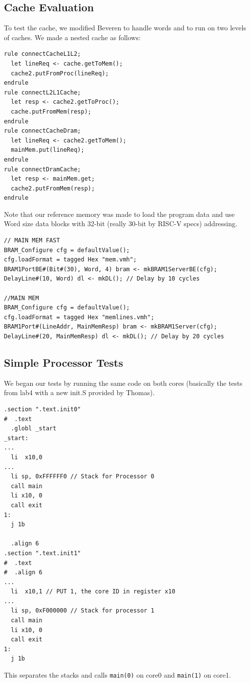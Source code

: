 \documentclass{article}
\begin{document}
\subsection{Cache Evaluation}
To test the cache, we modified Beveren to handle words and to run on two levels of caches. We made a nested cache as follows:
\begin{lstlisting}
rule connectCacheL1L2;
  let lineReq <- cache.getToMem();
  cache2.putFromProc(lineReq);
endrule
rule connectL2L1Cache;
  let resp <- cache2.getToProc();
  cache.putFromMem(resp);
endrule
rule connectCacheDram;
  let lineReq <- cache2.getToMem();
  mainMem.put(lineReq);
endrule
rule connectDramCache;
  let resp <- mainMem.get;
  cache2.putFromMem(resp);
endrule
\end{lstlisting}
Note that our reference memory was made to load the program data and use Word size data blocks with 32-bit (really 30-bit by RISC-V specs) addressing.
\begin{lstlisting}
// MAIN MEM FAST
BRAM_Configure cfg = defaultValue();
cfg.loadFormat = tagged Hex "mem.vmh";
BRAM1PortBE#(Bit#(30), Word, 4) bram <- mkBRAM1ServerBE(cfg);
DelayLine#(10, Word) dl <- mkDL(); // Delay by 10 cycles

//MAIN MEM
BRAM_Configure cfg = defaultValue();
cfg.loadFormat = tagged Hex "memlines.vmh";
BRAM1Port#(LineAddr, MainMemResp) bram <- mkBRAM1Server(cfg);
DelayLine#(20, MainMemResp) dl <- mkDL(); // Delay by 20 cycles
\end{lstlisting}

\subsection{Simple Processor Tests}

We began our tests by running the same code on both cores (basically the tests from lab4 with a new init.S provided by Thomas).

\begin{lstlisting}[language=RSVAssembler]
.section ".text.init0"
#  .text
  .globl _start
_start:
...
  li  x10,0
...
  li sp, 0xFFFFFF0 // Stack for Processor 0
  call main
  li x10, 0
  call exit
1:
  j 1b

  .align 6
.section ".text.init1"
#  .text
#  .align 6
...
  li  x10,1 // PUT 1, the core ID in register x10
...
  li sp, 0xF000000 // Stack for processor 1
  call main
  li x10, 0
  call exit
1:
  j 1b
\end{lstlisting}

This separates the stacks and calls \lstinline|main(0)| on core0 and \lstinline|main(1)| on core1.
\end{document}

